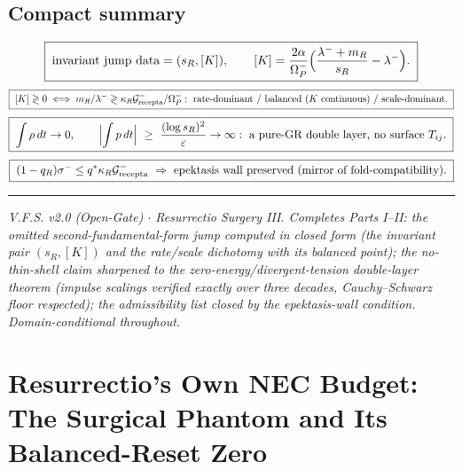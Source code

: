 \documentclass[11pt,a4paper,oneside]{book}
\newcommand{\Op}{\Omega_P}
\newcommand{\Grec}{\mathcal G_{\rm recepta}}
\newcommand{\sR}{s_R}
\newcommand{\mR}{m_R}
\newcommand{\Kj}{[K]}
\theoremstyle{plain}
\theoremstyle{definition}
\theoremstyle{remark}
\begin{document}
\section{Compact summary}

\[
\boxed{\;\text{invariant jump data}=(\sR,\Kj),\qquad
\Kj=\frac{2\alpha}{\Op^-}\Bigl(\frac{\lambda^-+\mR}{\sR}-\lambda^-\Bigr).\;}
\]
\[
\boxed{\;\Kj\gtrless0\iff \mR/\lambda^-\gtrless\kappa_R\Grec^-/\Op^-:
\ \text{rate-dominant / balanced ($K$ continuous) / scale-dominant.}\;}
\]
\[
\boxed{\;\int\rho\,dt\to0,\qquad
\Bigl|\int p\,dt\Bigr|\ \ge\ \frac{(\log\sR)^2}{\varepsilon}\to\infty:
\ \text{a pure-GR double layer, no surface }T_{ij}.\;}
\]
\[
\boxed{\;(1-q_R)\sigma^-\le q^\ast\kappa_R\Grec^-\ \Rightarrow\
\text{epektasis wall preserved (mirror of fold-compatibility).}\;}
\]

\vspace{0.5em}
\hrule
\smallskip
\noindent\footnotesize\emph{V.F.S. v2.0 (Open-Gate) $\cdot$ Resurrectio Surgery III. Completes
Parts I--II: the omitted second-fundamental-form jump computed in closed form (the invariant pair
$(\sR,\Kj)$ and the rate/scale dichotomy with its balanced point); the no-thin-shell claim sharpened to
the zero-energy/divergent-tension double-layer theorem (impulse scalings verified exactly over three
decades, Cauchy--Schwarz floor respected); the admissibility list closed by the epektasis-wall
condition. Domain-conditional throughout.}

\chapter{Resurrectio's Own NEC Budget: The Surgical Phantom and Its Balanced-Reset Zero}
\end{document}
